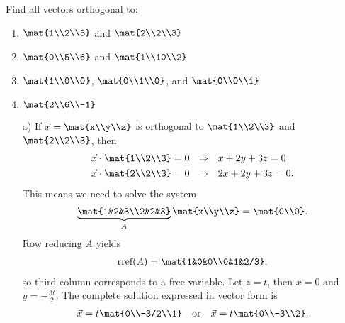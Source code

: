 \begin{exercises}
\begin{problist}
		\prob Find all vectors orthogonal to:
		\begin{enumerate}
			\item $\mat{1\\2\\3}$ and $\mat{2\\2\\3}$
			\item $\mat{0\\5\\6}$ and $\mat{1\\10\\2}$
			\item $\mat{1\\0\\0}$, $\mat{0\\1\\0}$, and $\mat{0\\0\\1}$
			\item $\mat{2\\6\\-1}$
		\end{enumerate}
		\begin{solution}
			\begin{enumerate}
				\item[a)] If $\vec{x} = \mat{x\\y\\z}$ is orthogonal to $\mat{1\\2\\3}$ and $\mat{2\\2\\3}$, then
				\begin{align*}
					\vec{x} \cdot \mat{1\\2\\3} &= 0 \ \ \Rightarrow \ \ x+2y+3z = 0 \\
					\vec{x} \cdot \mat{2\\2\\3} &= 0 \ \ \Rightarrow \ \ 2x+2y+3z = 0.
				\end{align*}
			This means we need to solve the system
				\begin{align*}
					\underbrace{\mat{1&2&3\\2&2&3}}_{A} \mat{x\\y\\z} = \mat{0\\0}.
				\end{align*}
			Row reducing $A$ yields
				\begin{align*}
					\textrm{rref}(A) = \mat{1&0&0\\0&1&2/3},
				\end{align*}
			so third column corresponds to a free variable. Let $z=t$, then $x=0$ and $y = -\frac{3t}{2}$. The complete solution expressed in vector form is
				\begin{align*}
					\vec{x} = t\mat{0\\-3/2\\1} \ \ \ \textrm{or} \ \ \ \vec{x} = t\mat{0\\-3\\2}.
				\end{align*}
		

\end{enumerate}
\end{solution}
\end{problist}
\end{exercises}
